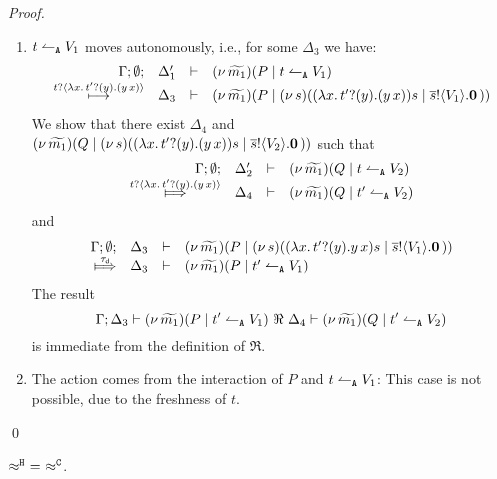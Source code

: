 \begin{proof}
\begin{enumerate}[1.]
\begin{enumerate}
					\item	$t \leftharpoonup_\mathtt{A} V_1$ moves autonomously, i.e., for some $\Delta_3$ we have:
						\[
							\begin{array}{rcll} \Gamma; \emptyset; &\Delta_1'& \vdash& (\nu\, \widetilde{m_1})(P \;|\; t \leftharpoonup_\mathtt{A} V_1)\\ \stackrel{t ? \langle  \lambda x.\,t' ? (y) .{(y\, {x})}  \rangle}{\longmapsto} &\Delta_3& \vdash &  (\nu\, \widetilde{m_1})(P \;|\; (\nu\, s)(  (\lambda x.\,t' ? (y) .{(y\, {x})}){s}  \;|\; \overline{s} ! \langle V_1 \rangle . \mathbf{0} \, {)}) \end{array}
						\]
						We show that there
                                                exist $\Delta_4$ and  $(\nu\, \widetilde{m_1})(Q \;|\; (\nu\, s)(  (\lambda x.\,t' ? (y) .{(y\, {x})}){s}  \;|\; \overline{s} ! \langle V_2 \rangle . \mathbf{0} \, {)})$ such that
						\[
							\mhorel{\Gamma}{\Delta_2'}{\newsp{\widetilde{m_1}}{Q \Par \ntrigger{t}{V_2}}}
							{\Hby{\bactinp{t}{ \abs{x}{\binp{t'}{y}{(\appl{y}{x})}  }}}}
							{\Delta_4}{}{\newsp{\widetilde{m_1}}{Q \Par \ntrigger{t'}{V_2} }}
						\]
						and
						\[
							\mhorel{\Gamma}{\Delta_3}{\newsp{\widetilde{m_1}}{P \Par \newsp{s}{ \appl{(\abs{x}{\binp{t'}{y}{\appl{y}{x}})}{s}  \Par \bout{\dual{s}}{V_1} \inact }}}}
							{\Hby{\dtau}}
							{\Delta_3}{}{\newsp{\widetilde{m_1}}{P \Par \ntrigger{t'}{V_1}}}
						\]
						The result
						\[
							\Gamma; \Delta_3 \vdash (\nu\, \widetilde{m_1})(P \;|\; t' \leftharpoonup_\mathtt{A} V_1) \ \Re\  \Delta_4 \vdash (\nu\, \widetilde{m_1})(Q \;|\; t' \leftharpoonup_\mathtt{A} V_2)
						\]
						is immediate from the definition of $\Re$.

				\item The action comes from the interaction of $P$ and $t \leftharpoonup_\mathtt{A} V_1$: This case is not possible, due to the freshness of $t$.
				\end{enumerate}
	\end{enumerate}
	\qed
\end{proof}



\begin{lemma}
	\label{app:lem:wb_eq_wbf}
	$\approx^\mathtt{H}\ =\ \approx^\mathtt{C}$.
\end{lemma}

